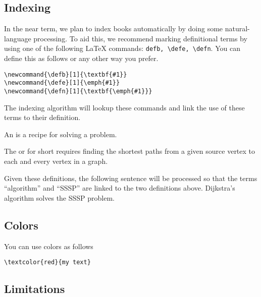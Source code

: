 \subsection{Indexing}

\begin{flex}
In the near term, we plan to index books automatically by doing some natural-language processing.  
%
To aid this, we recommend marking definitional terms by using one of the following LaTeX commands: \lstinline`defb, \defe, \defn`.  You can define this as follows or any other way you prefer.
%
\begin{lstlisting}
\newcommand{\defb}[1]{\textbf{#1}}
\newcommand{\defe}[1]{\emph{#1}}
\newcommand{\defn}[1]{\textbf{\emph{#1}}}
\end{lstlisting}
%
The indexing algorithm will lookup these commands and link the use of these terms to their definition.

\begin{example}
\begin{definition}[Algorithm]
\label{def:algorithm}
An  is a recipe for solving a problem.
\end{definition}


\begin{definition}
\label{def:sssp}
The  or  for short requires finding  the shortest paths from a given source vertex to each and every vertex in a graph. 
\end{definition}

Given these definitions, the following sentence will be processed so that the terms ``algorithm'' and ``SSSP'' are linked to the two definitions above.
%
Dijkstra's algorithm solves the SSSP problem.
\end{example}
\end{flex}

\subsection{Colors}

You can use colors as follows
\begin{lstlisting}
\textcolor{red}{my text}
\end{lstlisting}

\subsection{Limitations}
\label{sec:mtl::limitations}

